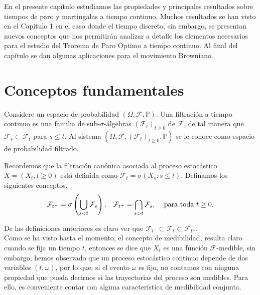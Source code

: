 En el presente capítulo estudiamos las propiedades y principales resultados sobre tiempos de paro y martingalas a tiempo continuo. Muchos resultados se han visto en el Capítulo 1 en el caso donde  el tiempo discreto, sin embargo, %
se presentan nuevos conceptos que nos permitirán analizar a detalle los elementos necesarios para el estudio del Teorema de Paro Óptimo a tiempo continuo. Al final del capítulo se dan algunas aplicaciones para el movimiento Browniano. 

\section{Conceptos fundamentales}

\begin{definition}
	Considere un espacio de probabilidad $(\Omega, \mathcal{F}, \mathbb{P})$. Una filtración a tiempo continuo es una familia de sub-$\sigma$-álgebras $(\mathcal{F}_t)_{t \geq 0}$ de $\mathcal{F}$, de tal manera que $\mathcal{F}_s \subset \mathcal{F}_t$ para $s \leq t$. Al sistema $(\Omega, \mathcal{F}, (\mathcal{F}_t)_{t \geq 0}, \mathbb{P})$ se le conoce como espacio de probabilidad filtrado.
\end{definition}

Recordemos que la filtración canónica asociada al proceso estocástico $X = (X_t, t \geq 0)$ está definida como $\mathcal{F}_t = \sigma(X_s : s \leq t)$. Definamos los siguientes conceptos.
\begin{align*}
	\mathcal{F}_{t^{-}} = \sigma \left( \bigcup_{s < t} \mathcal{F}_s \right), \hspace{0.3cm} \mathcal{F}_{t^{+}} = \bigcap_{s > t} \mathcal{F}_s, \hspace{0.3cm} \text{ para toda } t \geq 0.
\end{align*}

\noindent De las definiciones anteriores es claro ver que $\mathcal{F}_{t^{-}} \subset \mathcal{F}_t \subset \mathcal{F}_{t^{+}}$. \\

Como se ha visto hasta el momento, el concepto de medibilidad, resulta claro cuando se fija un tiempo $t$, entonces se dice que $X_t$ es una función $\mathcal{F}$-medible, sin embargo, hemos observado que un proceso estocástico continuo depende de dos variables $(t, \omega)$, por lo que; si el evento $\omega$ es fijo, no contamos con ninguna propiedad que pueda decirnos si las trayectorias del proceso son medibles. Para ello, es conveniente contar con alguna característica de medibilidad conjunta.


